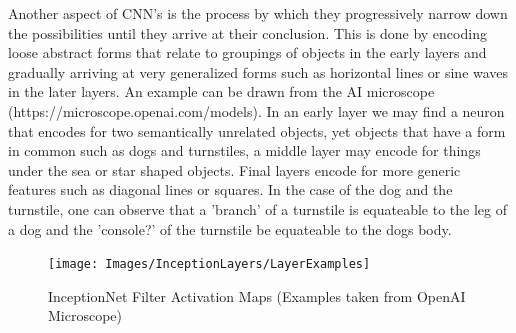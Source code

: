     Another aspect of CNN's is the process by which they progressively narrow down the possibilities until they arrive at their conclusion. This is done by encoding loose abstract forms that relate to groupings of objects in the early layers and gradually arriving at very generalized forms such as horizontal lines or sine waves in the later layers. An example can be drawn from the AI microscope (https://microscope.openai.com/models). In an early layer  we may find a neuron that encodes for two semantically unrelated objects, yet objects that have a form in common such as dogs and turnstiles, a middle layer may encode for things under the sea or star shaped objects. Final layers encode for more generic features such as diagonal lines or squares. In the case of the dog and the turnstile, one can observe that a 'branch' of a turnstile is equateable to the leg of a dog and the 'console?' of the turnstile be equateable to the dogs body.

    \begin{landscape}
      \begin{figure}[H]
        \begin{center}
          \texttt{[image: Images/InceptionLayers/LayerExamples]}
          \caption{InceptionNet Filter Activation Maps (Examples taken from OpenAI Microscope)}
          \label{fig:inceptionNet_filter_activation}
        \end{center}
      \end{figure}
    \end{landscape}
    \par

  \newpage
